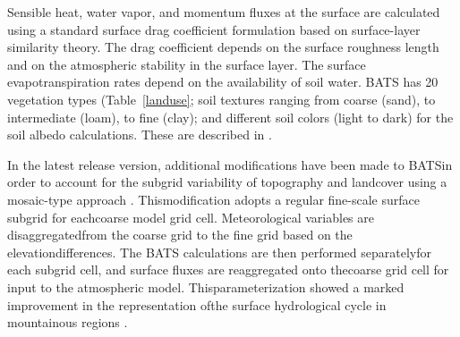 Sensible heat, water vapor, and momentum fluxes at the surface are calculated
using a standard surface drag coefficient formulation based on surface-layer
similarity theory.  The drag coefficient depends on the surface roughness length
and on the atmospheric stability in the surface layer.  The surface
evapotranspiration rates depend on the availability of soil water.  \ac{BATS}
has 20 vegetation types (Table~\ref{landuse};  soil textures ranging from coarse
(sand), to intermediate (loam), to fine (clay);  and different soil colors
(light to dark) for the soil albedo calculations.  These are described in
\cite{Dickinson_86}. 

In the latest release version, additional modifications have been made to
\ac{BATS}in order to account for the subgrid variability of topography and
landcover using a mosaic-type approach \citep{Giorgi03b}.  Thismodification
adopts a regular fine-scale surface subgrid for eachcoarse model grid cell.
Meteorological variables are disaggregatedfrom the coarse grid to the fine
grid based on the elevationdifferences.  The \ac{BATS} calculations are then
performed separatelyfor each subgrid cell, and surface fluxes are reaggregated
onto thecoarse grid cell for input to the atmospheric model.
Thisparameterization showed a marked improvement in the representation ofthe
surface hydrological cycle in mountainous regions \citep{Giorgi03b}. \\


